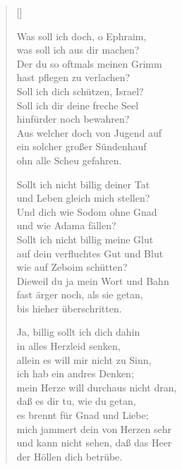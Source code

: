 \begin{multicols}{2}
\settowidth{\versewidth}{Sollt ich nicht billig deiner Tat}
\begin{verse}[\versewidth]

 Was soll ich doch, o Ephraim,\\
was soll ich aus dir machen?\\
Der du so oftmals meinen Grimm\\
hast pflegen zu verlachen?\\
Soll ich dich schützen, Israel?\\
Soll ich dir deine freche Seel\\
hinfürder noch bewahren?\\
Aus welcher doch von Jugend auf\\
ein solcher großer Sündenhauf\\
ohn alle Scheu gefahren.

 Sollt ich nicht billig deiner Tat\\
und Leben gleich mich stellen?\\
Und dich wie Sodom ohne Gnad\\
und wie Adama fällen?\\
Sollt ich nicht billig meine Glut\\
auf dein verfluchtes Gut und Blut\\
wie auf Zeboim schütten?\\
Dieweil du ja mein Wort und Bahn\\
fast ärger noch, als sie getan,\\
bis hieher überschritten.

 Ja, billig sollt ich dich dahin\\
in alles Herzleid senken,\\
allein es will mir nicht zu Sinn,\\
ich hab ein andres Denken;\\
mein Herze will durchaus nicht dran,\\
daß es dir tu, wie du getan,\\
es brennt für Gnad und Liebe;\\
mich jammert dein von Herzen sehr\\
und kann nicht sehen, daß das Heer\\
der Höllen dich betrübe.


\end{verse}
\end{multicols}
